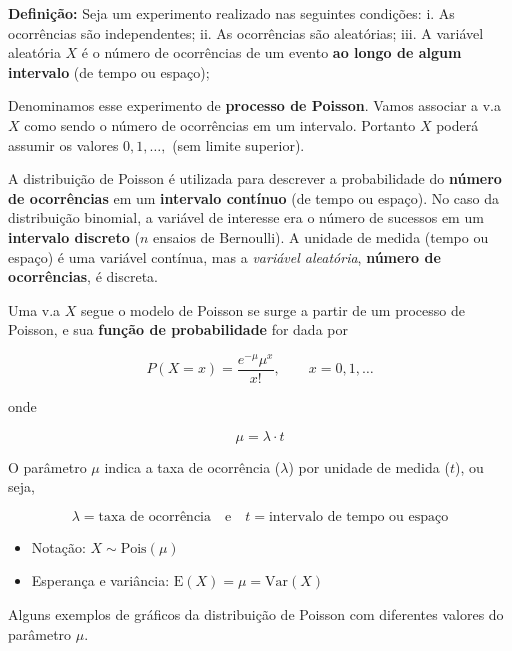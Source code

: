 \documentclass[
  10pt,
  a4paper]{book}
\providecommand{\tightlist}{%
  \setlength{\itemsep}{0pt}\setlength{\parskip}{0pt}}
\begin{document}
\textbf{Definição:} Seja um experimento realizado nas seguintes
condições:
i. As ocorrências são independentes;
ii. As ocorrências são aleatórias;
iii. A variável aleatória \(X\) é o número de ocorrências de um
evento \textbf{ao longo de algum intervalo} (de tempo ou espaço);

Denominamos esse experimento de \textbf{processo de Poisson}. Vamos associar
a v.a \(X\) como sendo o número de ocorrências em um intervalo.
Portanto \(X\) poderá assumir os valores \(0, 1, \ldots,\) (sem limite superior).

A distribuição de Poisson é utilizada para descrever a probabilidade do \textbf{número de ocorrências} em um \textbf{intervalo contínuo} (de tempo ou espaço). No caso da distribuição binomial, a variável de interesse era o número de sucessos em um \textbf{intervalo discreto} (\(n\) ensaios de Bernoulli). A unidade de medida (tempo ou espaço) é uma variável contínua, mas a \emph{variável aleatória}, \textbf{número de ocorrências}, é discreta.

Uma v.a \(X\) segue o modelo de Poisson se surge a partir de um
processo de Poisson, e sua \textbf{função de probabilidade} for dada por

\[
P(X = x) = \frac{e^{-\mu} \mu^x}{x!}, \quad \quad x = 0, 1, \ldots
\]

onde

\[
\mu = \lambda \cdot t
\]

O parâmetro \(\mu\) indica a taxa de ocorrência (\(\lambda\)) por unidade
de medida (\(t\)), ou seja,

\[
    \lambda = \text{taxa de ocorrência} \quad \text{e} \quad t =
    \text{intervalo de tempo ou espaço}
\]

\begin{itemize}
\tightlist
\item
  Notação: \(X \sim \text{Pois}(\mu)\)
\item
  Esperança e variância: \(\text{E}(X) = \mu = \text{Var}(X)\)
\end{itemize}

Alguns exemplos de gráficos da distribuição de Poisson com diferentes
valores do parâmetro \(\mu\).
\end{document}
